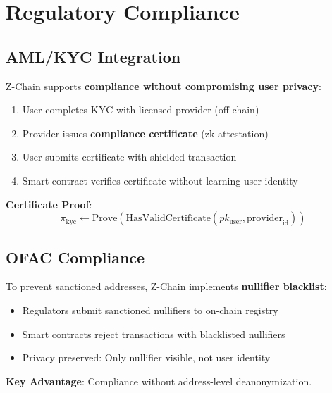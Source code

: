 \section{Regulatory Compliance}


\subsection{AML/KYC Integration}

Z-Chain supports \textbf{compliance without compromising user privacy}:

\begin{enumerate}
  \item User completes KYC with licensed provider (off-chain)
  \item Provider issues \textbf{compliance certificate} (zk-attestation)
  \item User submits certificate with shielded transaction
  \item Smart contract verifies certificate without learning user identity
\end{enumerate}

\textbf{Certificate Proof}:
\begin{equation}
\pi_{\text{kyc}} \leftarrow \text{Prove}\left(\text{HasValidCertificate}(pk_{\text{user}}, \text{provider}_{\text{id}})\right)
\end{equation}

\subsection{OFAC Compliance}

To prevent sanctioned addresses, Z-Chain implements \textbf{nullifier blacklist}:

\begin{itemize}[leftmargin=1.1em]
  \item Regulators submit sanctioned nullifiers to on-chain registry
  \item Smart contracts reject transactions with blacklisted nullifiers
  \item Privacy preserved: Only nullifier visible, not user identity
\end{itemize}

\textbf{Key Advantage}: Compliance without address-level deanonymization.

